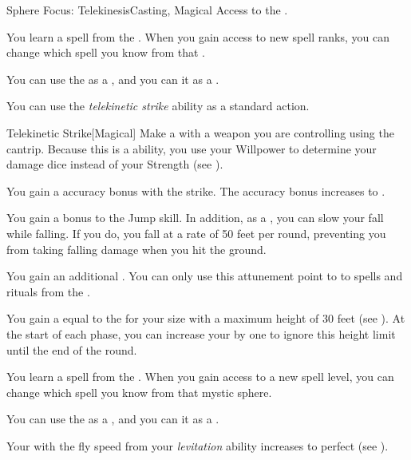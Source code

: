     \begin{feat}{Sphere Focus: Telekinesis}{Casting, Magical}
        \featpre Access to the  .

         You learn a spell from the  .
        When you gain access to new spell ranks, you can change which spell you know from that .

         You can use the   as a , and you can  it as a .

         You can use the \textit{telekinetic strike} ability as a standard action.
        \begin{freeability}{Telekinetic Strike}[Magical]
            Make a  with a weapon you are controlling using the  cantrip.
            Because this is a  ability, you use your Willpower to determine your damage dice instead of your Strength (see ).

            \rankline
             You gain a  accuracy bonus with the strike.
             The accuracy bonus increases to .
        \end{freeability}

         You gain a  bonus to the Jump skill.
        In addition, as a , you can slow your fall while falling.
        If you do, you fall at a rate of 50 feet per round, preventing you from taking falling damage when you hit the ground.

         You gain an additional .
        You can only use this attunement point to  to spells and rituals from the  .

         You gain a  equal to the  for your size with a maximum height of 30 feet (see ).
        At the start of each phase, you can increase your  by one to ignore this height limit until the end of the round.

         You learn a spell from the  .
        When you gain access to a new spell level, you can change which spell you know from that mystic sphere.

         You can use the   as a , and you can  it as a .

         Your  with the fly speed from your \textit{levitation} ability increases to perfect (see ).
    \end{feat}

